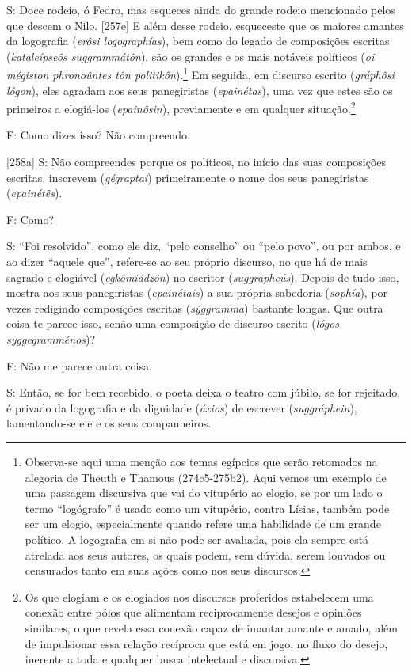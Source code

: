 S: Doce rodeio, ó Fedro, mas esqueces ainda do grande rodeio mencionado
pelos que descem o Nilo. {[}257e{]} E além desse rodeio, esqueceste que
os maiores amantes da logografia (\emph{erôsi logographías}), bem como
do legado de composições escritas (\emph{kataleípseôs suggrammátôn}),
são os grandes e os mais notáveis políticos (\emph{oi mégiston
phronoûntes tôn politikôn}).\footnote{Observa-se aqui uma menção aos
  temas egípcios que serão retomados na alegoria de Theuth e Thamous
  (274c5-275b2). Aqui vemos um exemplo de uma passagem discursiva que
  vai do vitupério ao elogio, se por um lado o termo ``logógrafo'' é
  usado como um vitupério, contra Lísias, também pode ser um elogio,
  especialmente quando refere uma habilidade de um grande político. A
  logografia em si não pode ser avaliada, pois ela sempre está atrelada
  aos seus autores, os quais podem, sem dúvida, serem louvados ou
  censurados tanto em suas ações como nos seus discursos.} Em seguida,
em discurso escrito (\emph{gráphôsi lógon}), eles agradam aos seus
panegiristas (\emph{epainétas}), uma vez que estes são os primeiros a
elogiá-los (\emph{epainôsin}), previamente e em qualquer
situação.\footnote{Os que elogiam e os elogiados nos discursos
  proferidos estabelecem uma conexão entre pólos que alimentam
  reciprocamente desejos e opiniões similares, o que revela essa conexão
  capaz de imantar amante e amado, além de impulsionar essa relação
  recíproca que está em jogo, no fluxo do desejo, inerente a toda e
  qualquer busca intelectual e discursiva.}

F: Como dizes isso? Não compreendo.

{[}258a{]} S: Não compreendes porque os políticos, no início das suas
composições escritas, inscrevem (\emph{gégraptai}) primeiramente o nome
dos seus panegiristas (\emph{epainétês}).

F: Como?

S: ``Foi resolvido'', como ele diz, ``pelo conselho'' ou ``pelo povo'',
ou por ambos, e ao dizer ``aquele que'', refere-se ao seu próprio
discurso, no que há de mais sagrado e elogiável (\emph{egkômiádzôn}) no
escritor (\emph{suggrapheús}). Depois de tudo isso, mostra aos seus
panegiristas (\emph{epainétais}) a sua própria sabedoria
(\emph{sophía}), por vezes redigindo composições escritas
(\emph{sýggramma}) bastante longas. Que outra coisa te parece isso,
senão uma composição de discurso escrito (\emph{lógos syggegramménos})?

F: Não me parece outra coisa.

S: Então, se for bem recebido, o poeta deixa o teatro com júbilo, se for
rejeitado, é privado da logografia e da dignidade (\emph{áxios}) de
escrever (\emph{suggráphein}), lamentando-se ele e os seus companheiros.

